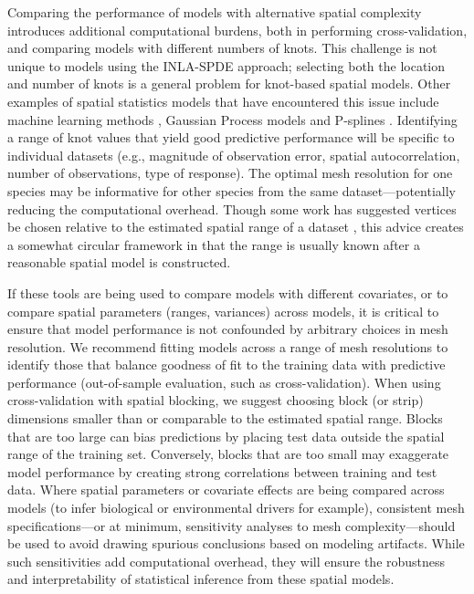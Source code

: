 \documentclass[11pt]{article}
\begin{document}
Comparing the performance of models with alternative spatial complexity
introduces additional computational burdens, both in performing
cross-validation, and comparing models with different numbers of knots. This
challenge is not unique to models using the INLA-SPDE approach; selecting both
the location and number of knots is a general problem for knot-based spatial
models. Other examples of spatial statistics models that have encountered this
issue include machine learning methods \citep[reviewed in][]{banerjee2013},
Gaussian Process models \citep{garton2020} and P-splines \citep{ruppert2002}.
Identifying a range of knot values that yield good predictive performance will
be specific to individual datasets (e.g., magnitude of observation error,
spatial autocorrelation, number of observations, type of response). The optimal
mesh resolution for one species may be informative for other species from the
same dataset---potentially reducing the computational overhead. Though some
work has suggested vertices be chosen relative to the estimated spatial range
of a dataset \citep{roste_2020}, this advice creates a somewhat circular
framework in that the range is usually known after a reasonable spatial model
is constructed.

If these tools are being used to compare models with different covariates, or
to compare spatial parameters (ranges, variances) across models, it is critical
to ensure that model performance is not confounded by arbitrary choices in mesh
resolution. We recommend fitting models across a range of mesh resolutions to
identify those that balance goodness of fit to the training data with
predictive performance (out-of-sample evaluation, such as cross-validation).
When using cross-validation with spatial blocking, we suggest choosing block
(or strip) dimensions smaller than or comparable to the estimated spatial
range. Blocks that are too large can bias predictions by placing test data
outside the spatial range of the training set. Conversely, blocks that are too
small may exaggerate model performance by creating strong correlations between
training and test data. Where spatial parameters or covariate effects are being
compared across models (to infer biological or environmental drivers for
example), consistent mesh specifications---or at minimum, sensitivity analyses
to mesh complexity---should be used to avoid drawing spurious conclusions based
on modeling artifacts. While such sensitivities add computational overhead,
they will ensure the robustness and interpretability of statistical inference
from these spatial models.
\end{document}
